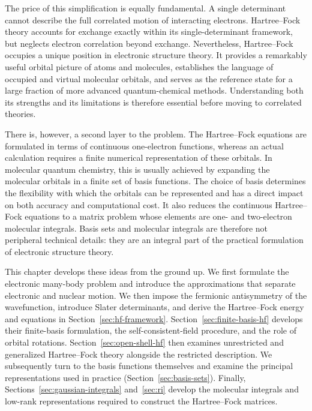 \documentclass[11pt,a4paper,titlepage]{article}
\numberwithin{equation}{section}
\begin{document}
The price of this simplification is equally fundamental. A single determinant
cannot describe the full correlated motion of interacting electrons.
Hartree--Fock theory accounts for exchange exactly within its
single-determinant framework, but neglects electron correlation beyond
exchange. Nevertheless, Hartree--Fock occupies a unique position in electronic structure
theory. It provides a remarkably useful orbital picture of atoms and
molecules, establishes the language of occupied and virtual molecular
orbitals, and serves as the reference state for a large fraction of more
advanced quantum-chemical methods. Understanding both its strengths and its
limitations is therefore essential before moving to correlated theories.

There is, however, a second layer to the problem. The Hartree--Fock equations
are formulated in terms of continuous one-electron functions, whereas an
actual calculation requires a finite numerical representation of these
orbitals. In molecular quantum chemistry, this is usually achieved by
expanding the molecular orbitals in a finite set of basis functions. The
choice of basis determines the flexibility with which the orbitals can be
represented and has a direct impact on both accuracy and computational cost.
It also reduces the continuous Hartree--Fock equations to a matrix problem
whose elements are one- and two-electron molecular integrals. Basis sets and
molecular integrals are therefore not peripheral technical details: they are
an integral part of the practical formulation of electronic structure theory.

This chapter develops these ideas from the ground up. We first formulate the
electronic many-body problem and introduce the approximations that separate
electronic and nuclear motion. We then impose the fermionic antisymmetry of
the wavefunction, introduce Slater determinants, and derive the
Hartree--Fock energy and equations in Section~\ref{sec:hf-framework}.
Section~\ref{sec:finite-basis-hf} develops their finite-basis formulation,
the self-consistent-field procedure, and the role of orbital rotations.
Section~\ref{sec:open-shell-hf} then examines unrestricted and generalized
Hartree--Fock theory alongside the restricted description. We subsequently
turn to the basis functions themselves and examine the principal
representations used in practice (Section~\ref{sec:basis-sets}). Finally,
Sections~\ref{sec:gaussian-integrals} and~\ref{sec:ri} develop the molecular
integrals and low-rank representations required to construct the
Hartree--Fock matrices.
\end{document}

